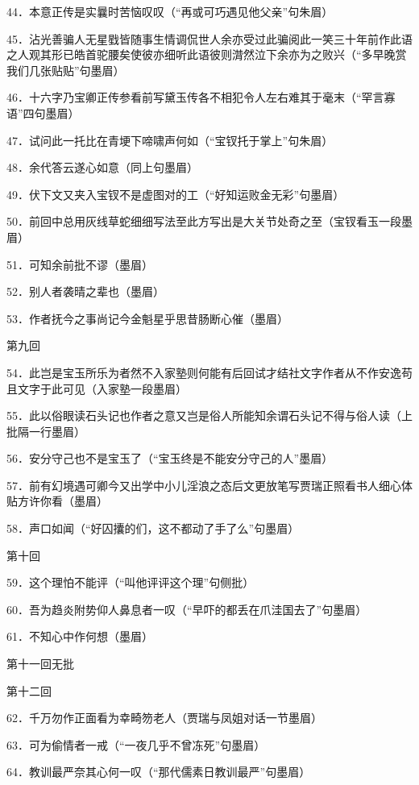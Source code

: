 44．本意正传是实曩时苦恼叹叹{（\kaishu ``再或可巧遇见他父亲''句朱眉）}

45．沾光善骗人无星戥皆随事生情调侃世人余亦受过此骗阅此一笑三十年前作此语之人观其形已皓首驼腰矣使彼亦细听此语彼则潸然泣下余亦为之败兴{（\kaishu ``多早晚赏我们几张贴贴''句墨眉）}

46．十六字乃宝卿正传参看前写黛玉传各不相犯令人左右难其于毫末{（\kaishu ``罕言寡语''四句墨眉）}

47．试问此一托比在青埂下啼啸声何如{（\kaishu ``宝钗托于掌上''句朱眉）}

48．余代答云遂心如意{（\kaishu 同上句墨眉）}

49．伏下文又夹入宝钗不是虚图对的工{（\kaishu ``好知运败金无彩''句墨眉）}

50．前回中总用灰线草蛇细细写法至此方写出是大关节处奇之至{（\kaishu 宝钗看玉一段墨眉）}

51．可知余前批不谬{（\kaishu 墨眉）}

52．别人者袭晴之辈也{（\kaishu 墨眉）}

53．作者抚今之事尚记今金魁星乎思昔肠断心催{（\kaishu 墨眉）}

第九回

54．此岂是宝玉所乐为者然不入家塾则何能有后回试才结社文字作者从不作安逸苟且文字于此可见{（\kaishu 入家塾一段墨眉）}

55．此以俗眼读石头记也作者之意又岂是俗人所能知余谓石头记不得与俗人读{（\kaishu 上批隔一行墨眉）}

56．安分守己也不是宝玉了{（\kaishu ``宝玉终是不能安分守己的人''墨眉）}

57．前有幻境遇可卿今又出学中小儿淫浪之态后文更放笔写贾瑞正照看书人细心体贴方许你看{（\kaishu 墨眉）}

58．声口如闻{（\kaishu ``好囚攮的们，这不都动了手了么''句墨眉）}

第十回

59．这个理怕不能评{（\kaishu ``叫他评评这个理''句侧批）}

60．吾为趋炎附势仰人鼻息者一叹{（\kaishu ``早吓的都丢在爪洼国去了''句墨眉）}

61．不知心中作何想{（\kaishu 墨眉）}

第十一回无批

第十二回

62．千万勿作正面看为幸畸笏老人{（\kaishu 贾瑞与凤姐对话一节墨眉）}

63．可为偷情者一戒{（\kaishu ``一夜几乎不曾冻死''句墨眉）}

64．教训最严奈其心何一叹{（\kaishu ``那代儒素日教训最严''句墨眉）}

